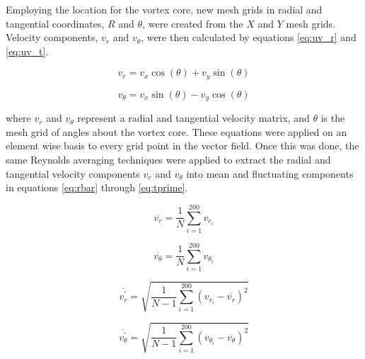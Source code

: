 Employing the location for the vortex core, new mesh grids in radial and 
tangential coordinates, $R$ and $\theta$, were created from the $X$ and 
$Y$ mesh grids. Velocity components, $v_r$ and $v_\theta$, were then 
calculated by equations \ref{eq:uv_r} and \ref{eq:uv_t}.

\begin{equation}
v_{r} = v_{x} \cos{(\theta)} + v_{y} \sin{(\theta)}
\label{eq:uv_r}
\end{equation}

\begin{equation}
v_{\theta} = v_{x} \sin{(\theta)} - v_{y} \cos{(\theta)}
\label{eq:uv_t}
\end{equation}

where $v_{r}$ and $v_{\theta}$ represent a radial and tangential velocity 
matrix, and $\theta$ is the mesh grid of angles 
about the vortex core. These equations were applied on an element wise basis to 
every grid point in the vector field. Once this was done, the same Reynolds 
averaging techniques were applied to extract the radial and tangential velocity 
components $v_{r}$ and $v_{\theta}$ into mean and fluctuating components in 
equations 
\ref{eq:rbar} through \ref{eq:tprime}.

\begin{equation}
\overline{v_r}  = \frac{1}{N} \sum_{i=1}^{200} v_{r_i}
\label{eq:rbar}
\end{equation}

\begin{equation}
\overline{v_\theta}  = \frac{1}{N} \sum_{i=1}^{200} v_{\theta_i}
\label{eq:tbar}
\end{equation}

\begin{equation}
\overline{v_r^\prime} = \sqrt{\frac{1}{N-1} \sum_{i=1}^{200} (v_{r_i} - 
\overline{v_r})^2}
\label{eq:rprime}
\end{equation}

\begin{equation}
\overline{v_\theta^\prime} = \sqrt{\frac{1}{N-1} \sum_{i=1}^{200} (v_{\theta_i} 
- 
\overline{v_\theta})^2}
\label{eq:tprime}
\end{equation}

